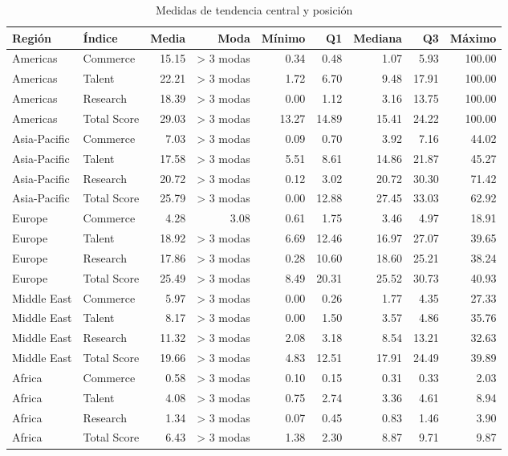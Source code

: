 \documentclass[
]{article}
\begin{document}
\renewcommand{\arraystretch}{1.3}
\begin{scriptsize}
\begin{longtable}[t]{llrrrrrrr}
\caption{\label{tab:tabla3}Medidas de tendencia central y posición}\\
\toprule
Región & Índice & Media & Moda & Mínimo & Q1 & Mediana & Q3 & Máximo\\
\midrule
Americas & Commerce & 15.15 & > 3 modas & 0.34 & 0.48 & 1.07 & 5.93 & 100.00\\
Americas & Talent & 22.21 & > 3 modas & 1.72 & 6.70 & 9.48 & 17.91 & 100.00\\
Americas & Research & 18.39 & > 3 modas & 0.00 & 1.12 & 3.16 & 13.75 & 100.00\\
Americas & Total Score & 29.03 & > 3 modas & 13.27 & 14.89 & 15.41 & 24.22 & 100.00\\
Asia-Pacific & Commerce & 7.03 & > 3 modas & 0.09 & 0.70 & 3.92 & 7.16 & 44.02\\
\addlinespace
Asia-Pacific & Talent & 17.58 & > 3 modas & 5.51 & 8.61 & 14.86 & 21.87 & 45.27\\
Asia-Pacific & Research & 20.72 & > 3 modas & 0.12 & 3.02 & 20.72 & 30.30 & 71.42\\
Asia-Pacific & Total Score & 25.79 & > 3 modas & 0.00 & 12.88 & 27.45 & 33.03 & 62.92\\
Europe & Commerce & 4.28 & 3.08 & 0.61 & 1.75 & 3.46 & 4.97 & 18.91\\
Europe & Talent & 18.92 & > 3 modas & 6.69 & 12.46 & 16.97 & 27.07 & 39.65\\
\addlinespace
Europe & Research & 17.86 & > 3 modas & 0.28 & 10.60 & 18.60 & 25.21 & 38.24\\
Europe & Total Score & 25.49 & > 3 modas & 8.49 & 20.31 & 25.52 & 30.73 & 40.93\\
Middle East & Commerce & 5.97 & > 3 modas & 0.00 & 0.26 & 1.77 & 4.35 & 27.33\\
Middle East & Talent & 8.17 & > 3 modas & 0.00 & 1.50 & 3.57 & 4.86 & 35.76\\
Middle East & Research & 11.32 & > 3 modas & 2.08 & 3.18 & 8.54 & 13.21 & 32.63\\
\addlinespace
Middle East & Total Score & 19.66 & > 3 modas & 4.83 & 12.51 & 17.91 & 24.49 & 39.89\\
Africa & Commerce & 0.58 & > 3 modas & 0.10 & 0.15 & 0.31 & 0.33 & 2.03\\
Africa & Talent & 4.08 & > 3 modas & 0.75 & 2.74 & 3.36 & 4.61 & 8.94\\
Africa & Research & 1.34 & > 3 modas & 0.07 & 0.45 & 0.83 & 1.46 & 3.90\\
Africa & Total Score & 6.43 & > 3 modas & 1.38 & 2.30 & 8.87 & 9.71 & 9.87\\
\bottomrule
\end{longtable}

\end{scriptsize}\renewcommand{\arraystretch}{1}
\end{document}
